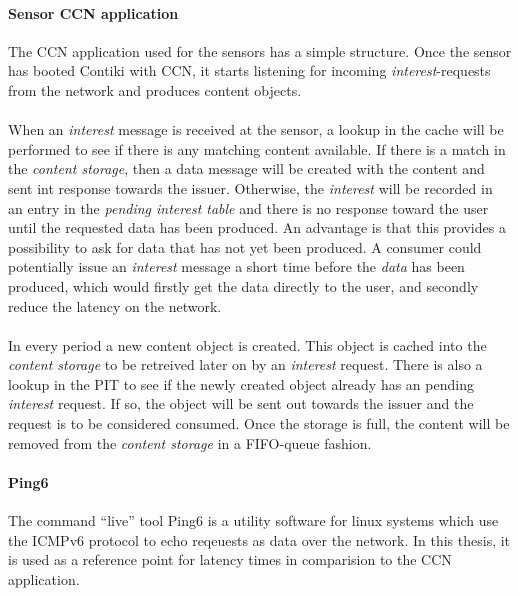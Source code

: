 \paragraph{Sensor CCN application}
The CCN application used for the sensors has a simple structure. Once the sensor has booted Contiki with CCN, it starts listening for incoming \textit{interest}-requests from the network and produces content objects.\\\\
When an \textit{interest} message is received at the sensor, a lookup in the cache will be performed to see if there is any matching content available. If there is a match in the \textit{content storage}, then a data message will be created with the content and sent int response towards the issuer. Otherwise, the \textit{interest} will be recorded in an entry in the \textit{pending interest table} and there is no response toward the user until the requested data has been produced.
An advantage is that this provides a possibility to ask for data that has not yet been produced. 
A consumer could potentially issue an \textit{interest} message a short time before the \textit{data} has been produced, which would firstly get the data directly to the user, and secondly reduce the latency on the network. 
\\\\
In every period a new content object is created. This object is cached into the \textit{content storage} to be retreived later on by an \textit{interest} request. There is also a lookup in the PIT to see if the newly created object already has an pending \textit{interest} request. If so, the object will be sent out towards the issuer and the request is to be considered consumed. Once the storage is full, the content will be removed from the \textit{content storage} in a FIFO-queue fashion.


\paragraph{Ping6}
The command ``live'' tool Ping6 is a utility software for linux systems which use the ICMPv6 protocol to echo reqeuests as data over the network. In this thesis, it is used as a reference point for latency times in comparision to the CCN application.

